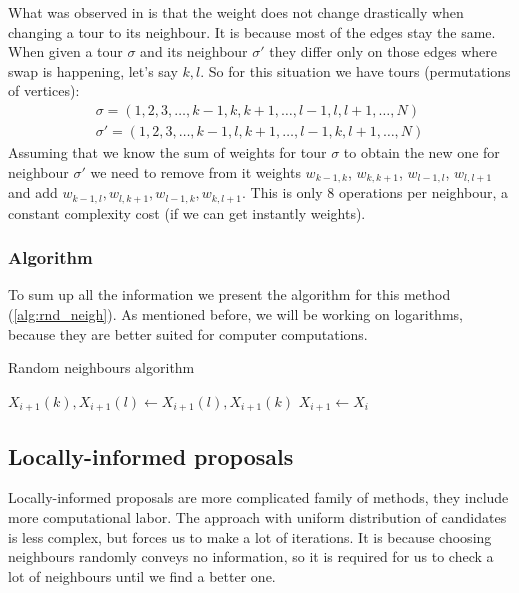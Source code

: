 		What was observed in \cite{decryption_tsp_MCMC} is that the weight does not change drastically when changing a tour to its neighbour. It is because most of the edges stay the same. When given a tour $\sigma$ and its neighbour $\sigma'$ they differ only on those edges where swap is happening, let's say $k,l$. So for this situation we have tours (permutations of vertices):
		\begin{align*}
			\sigma = (1, 2, 3, \ldots, k-1, k, k+1, \ldots, l-1, l, l+1, \ldots, N) \\
			\sigma' = (1, 2, 3, \ldots, k-1, l, k+1, \ldots, l-1, k, l+1, \ldots, N)
		\end{align*}
		Assuming that we know the sum of weights for tour $\sigma$ to obtain the new one for neighbour $\sigma'$ we need to remove from it weights $w_{k-1, k}$, $w_{k, k+1}$, $w_{l-1, l}$, $w_{l, l+1}$ and add $w_{k-1, l}, w_{l, k+1}, w_{l-1, k}, w_{k, l+1}$. This is only $8$ operations per neighbour, a constant complexity cost (if we can get instantly weights).
		
	\subsubsection{Algorithm}
		To sum up all the information we present the algorithm for this method (\ref{alg:rnd_neigh}). As mentioned before, we will be working on logarithms, because they are better suited for computer computations.
		
		\begin{algorithm}
			\caption{Random neighbours algorithm}\label{alg:rnd_neigh}
			\begin{algorithmic}[1]
				
				\State $X_{i+1}(k), X_{i+1}(l) \gets X_{i+1}(l), X_{i+1}(k)$
				\Else
				\State $X_{i+1} \gets X_i$
				\EndIf
				\EndFor
			\end{algorithmic}
		\end{algorithm}

\subsection{Locally-informed proposals}
	Locally-informed proposals are more complicated family of methods, they include more computational labor. The approach with uniform distribution of candidates is less complex, but forces us to make a lot of iterations. It is because choosing neighbours randomly conveys no information, so it is required for us to check a lot of neighbours until we find a better one. 
	
